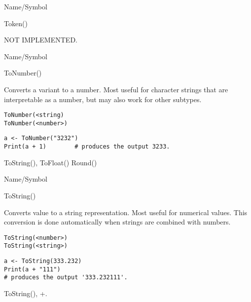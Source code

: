 \rl


\begin{desc}{Name/Symbol}
\item[Name/Symbol]  	Token()

\item[Description]  	NOT IMPLEMENTED.

\item[Usage]		

\item[Example]	

\item[See Also]	
\end{desc}

\rl


\begin{desc}{Name/Symbol}
\item[Name/Symbol]  	ToNumber()

\item[Description]  	Converts a variant to a number. Most useful for character 
			strings that are interpretable as a number, but may also work 
			for other subtypes.

\item[Usage]     
\begin{verbatim}
ToNumber(<string)
ToNumber(<number>)
\end{verbatim}

\item[Example]
\begin{verbatim}
a <- ToNumber("3232")
Print(a + 1)		# produces the output 3233. 
\end{verbatim}

\item[See Also]     	ToString(), ToFloat() Round()
\end{desc}

\rl


\begin{desc}{Name/Symbol}
\item[Name/Symbol]  	ToString()

\item[Description]  	Converts value to a string representation. Most useful for 
		numerical values.  This conversion is done automatically when 
		strings are combined with numbers.

\item[Usage]     
\begin{verbatim}
ToString(<number>)
ToString(<string>)
\end{verbatim}

\item[Example]
\begin{verbatim}
a <- ToString(333.232)
Print(a + "111")
# produces the output '333.232111'.
\end{verbatim}
		

\item[See Also]    	ToString(), +.
\end{desc}

